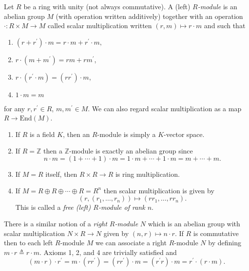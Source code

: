\begin{defn}[Module]
Let $R$ be a ring with unity (not always commutative).
A (left) \emph{$R$-module} is an abelian group $M$
(with operation written additively) together with
an operation $\cdot : R \times M \to M$ called
scalar multiplication written
$(r, m) \mapsto r \cdot m$ and such that
\begin{enumerate}
  \item{
    $(r + r^\prime) \cdot m =
     r \cdot m + r^\prime \cdot m,
    $
  }
  \item{
    $r \cdot (m + m^\prime) = r m + r m^\prime$,
  }
  \item{
    $r \cdot (r^\prime \cdot m) = (r r^\prime) \cdot m$,
  }
  \item{
    $1 \cdot m = m$
  }
\end{enumerate}
for any $r, r^\prime \in R$, $m, m^\prime \in M$.
We can also regard scalar multiplication as a map
$R \to \mathrm{End}(M)$.
\end{defn}

\begin{xmpl}
  \begin{enumerate}
    \item{
      If $R$ is a field $K$, then an $R$-module is simply a $K$-vector
      space.
    }
    \item{
      If $R = \mathbb{Z}$ then a $\mathbb{Z}$-module is exactly an
      abelian group since
      $$
        n \cdot m
      = (1 + \cdots + 1) \cdot m
      = 1 \cdot m + \cdots + 1 \cdot m
      = m + \cdots + m.
      $$
    }
    \item{
      If $M = R$ itself, then $R \times R \to R$ is ring
      multiplication.
    }
    \item{
      If $M = R \oplus R \oplus \cdots \oplus R = R^n$ then scalar
      multiplication is given by
      $$
      (r, (r_1, \dots, r_n)) \mapsto (rr_1, \dots, rr_n).
      $$
      This is called a \emph{free (left) $R$-module of rank $n$}.
    }
  \end{enumerate}
\end{xmpl}

There is a similar notion of a \emph{right $R$-module} $N$ which is an
abelian group with scalar multiplication $N \times R \to N$ given by
$(n, r) \mapsto n \cdot r$. If $R$ is commutative then to each
left $R$-module $M$ we can associate a right $R$-module $N$
by defining $m \cdot r \triangleq r \cdot m$. Axioms 1, 2, and 4 are
trivially satisfied and
$$
  (m \cdot r) \cdot r^\prime
= m \cdot (r r^\prime)
= (r r^\prime) \cdot m
= (r^\prime r) \cdot m
= r^\prime \cdot (r \cdot m).
$$


